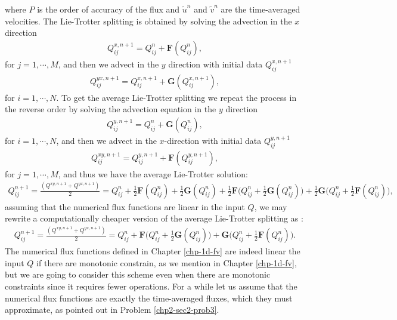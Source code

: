 where $P$ is the order of accuracy of the flux and $\tilde{u}^n$ and $\tilde{v}^n$ are the time-averaged velocities.
The Lie-Trotter splitting is obtained by solving the advection in the $x$ direction
\begin{align*}
	{Q}_{ij}^{x,n+1} =  {Q}_{ij}^{n} + \mathbf{F}({Q_{ij}^n}),
\end{align*}
for $j=1, \cdots, M$, and then we advect in the $y$ direction with initial data ${Q}_{ij}^{x,n+1}$ 
\begin{align*}
	{Q}_{ij}^{yx,n+1} = Q_{ij}^{x,n+1} + \mathbf{G}({Q_{ij}^{x,n+1}}),
\end{align*}
for $i=1, \cdots, N$.
To get the average Lie-Trotter splitting we repeat the process in the reverse order by solving the advection equation
in the $y$ direction
\begin{align*}
	{Q}_{ij}^{y,n+1} =  {Q}_{ij}^{n} + \mathbf{G}({Q_{ij}^n}),
\end{align*}
for $i=1, \cdots, N$, and then we advect in the $x$-direction with initial data ${Q}_{ij}^{y,n+1}$ 
\begin{align*}
	{Q}_{ij}^{xy,n+1} = Q_{ij}^{y,n+1} + \mathbf{F}({Q_{ij}^{y,n+1}}),
\end{align*}
for $j=1, \cdots, M$, and thus we have the average Lie-Trotter solution:
\begin{align*}
	Q^{n+1}_{ij} = \frac{(Q^{xy,n+1} + Q^{yx,n+1})}{2} = Q_{ij}^n + \frac{1}{2}\mathbf{F}(Q_{ij}^n) + \frac{1}{2}\mathbf{G}(Q_{ij}^n) + \frac{1}{2}\mathbf{F}\bigg(Q_{ij}^n + \frac{1}{2}\mathbf{G}(Q_{ij}^n)\bigg) + \frac{1}{2}\mathbf{G}\bigg(Q_{ij}^n + \frac{1}{2}\mathbf{F}(Q_{ij}^n)\bigg),
\end{align*}
assuming that the numerical flux functions are linear in the input $Q$, we may rewrite a computationally cheaper version
of the average Lie-Trotter splitting as \citep{lin:1996}:
\begin{align}
	\label{chp3-avlt}
	Q^{n+1}_{ij} = \frac{(Q^{xy,n+1} + Q^{yx,n+1})}{2} = Q_{ij}^n +  
	\mathbf{F}\bigg(Q_{ij}^n + \frac{1}{2}\mathbf{G}(Q_{ij}^n)\bigg) +  
	\mathbf{G}\bigg(Q_{ij}^n + \frac{1}{2}\mathbf{F}(Q_{ij}^n)\bigg).
\end{align}
The numerical flux functions defined in Chapter \ref{chp-1d-fv} are indeed linear the input $Q$ if there are monotonic constrain, 
as we mention in Chapter \ref{chp-1d-fv}, but we are going to consider this scheme even when there are monotonic constraints since it requires fewer operations.
For a while let us assume that the numerical flux functions are exactly the time-averaged fluxes, which they must approximate, as pointed out in Problem \ref{chp2-sec2-prob3}. 
